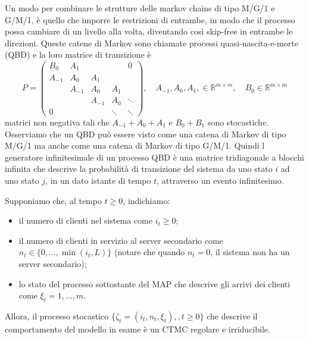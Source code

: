 \documentclass[11pt]{article}
\begin{document}
Un modo per combinare le strutture delle markov chains di tipo M/G/1 e G/M/1, è quello che imporre le restrizioni di entrambe, in modo che il processo possa cambiare di un livello alla volta, diventando così skip-free in entrambe le direzioni. Queste catene di Markov sono chiamate processi quasi-nascita-e-morte (QBD) e la loro matrice di transizione è
\begin{equation*}
    P=
    \begin{pmatrix}
        B_0 & A_1 & & & 0 \\
        A_{-1} & A_0 & A_1 & & \\
        & A_{-1} & A_0 & A_1 & \\
        & & A_{-1} & A_0 & \ddots \\
        0 & & & \ddots & \ddots
    \end{pmatrix}
    ,\quad A_{-1}, A_0, A_1, \in \mathbb{R}^{m \times m}, \quad B_0 \in \mathbb{R}^{m \times m}
\end{equation*}
matrici non negativa tali che $A_{-1} + A_0 + A_1$ e $B_0 + B_1$ sono stocastiche. Osserviamo che un QBD può essere visto come una catena di Markov di tipo M/G/1 ma anche come una catena di Markov di tipo G/M/1. Quindi l generatore infinitesimale di un processo QBD è una matrice tridiagonale a blocchi infinita che descrive la probabilità di transizione del sistema da uno stato $i$ ad uno stato $j$, in un dato istante di tempo $t$, attraverso un evento infinitesimo.

Supponiamo che, al tempo $t\geq 0$, indichiamo:
\begin{itemize}
    \item il numero di clienti nel sistema come $i_t\geq 0$;
    \item il numero di clienti in servizio al server secondario come $n_t\in\{0,\ldots,\min(i_t,L)\}$ (notare che quando $n_t=0$, il sistema non ha un server secondario);
    \item lo stato del processo sottostante del MAP che descrive gli arrivi dei clienti come $\xi_t=1,\ldots,m$.
\end{itemize}
Allora, il processo stocastico $\{\zeta_t=(i_t,n_t,\xi_t),,t\geq 0\}$ che descrive il comportamento del modello in esame è un CTMC regolare e irriducibile.
\end{document}
